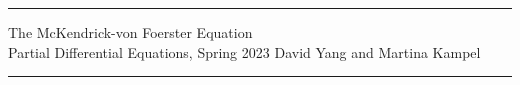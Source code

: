 \documentclass[11pt]{article}
\begin{document}
	\hrule
	\begin{center}
		{\Large The McKendrick-von Foerster Equation} \\ %
		\vspace{0.2cm}
		Partial Differential Equations, Spring 2023 \hfill David Yang and Martina Kampel%
	\end{center}

\hrule

\vspace{1em}











\end{document}
